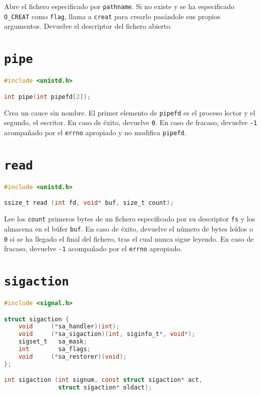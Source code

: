Abre el fichero especificado por \texttt{pathname}.
Si no existe y se ha especificado \texttt{O\_CREAT} como \texttt{flag}, llama a \texttt{creat} para crearlo pasándole sus propios argumentos.
Devuelve el descriptor del fichero abierto.

\section{\texttt{pipe}}\label{pipe}

\begin{lstlisting}[language=C]
#include <unistd.h>

int pipe(int pipefd[2]);
\end{lstlisting}

Crea un cauce sin nombre.
El primer elemento de \texttt{pipefd} es el proceso lector y el segundo, el escritor.
En caso de éxito, devuelve \texttt{0}.
En caso de fracaso, devuelve \texttt{-1} acompañado por el \texttt{errno} apropiado y no modifica \texttt{pipefd}.

\pagebreak

\section{\texttt{read}}\label{read}

\begin{lstlisting}[language=C]
#include <unistd.h>

ssize_t read (int fd, void* buf, size_t count);
\end{lstlisting}

Lee los \texttt{count} primeros bytes de un fichero especificado por su descriptor \texttt{fs} y los almacena en el búfer \texttt{buf}.
En caso de éxito, devuelve el número de bytes leídos o \texttt{0} si se ha llegado el final del fichero, tras el cual nunca sigue leyendo.
En caso de fracaso, devuelve \texttt{-1} acompañado por el \texttt{errno} apropiado.

\section{\texttt{sigaction}}\label{sigaction}

\begin{lstlisting}[language=C]
#include <signal.h>

struct sigaction {
	void     (*sa_handler)(int);
	void     (*sa_sigaction)(int, siginfo_t*, void*);
	sigset_t   sa_mask;
	int        sa_flags;
	void     (*sa_restorer)(void);
};

int sigaction (int signum, const struct sigaction* act,
               struct sigaction* oldact);
\end{lstlisting}

